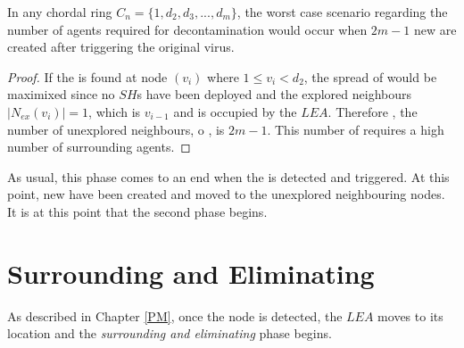  
\begin{theorem}

In any  chordal ring $C_n=\{1,d_2,d_3,...,d_m\}$, the worst case scenario regarding the number of agents required for decontamination would occur when $2m-1$ new \bvs are created after triggering the original virus.
\end{theorem}
\begin{proof}
If the \bv is found at node $(v_i)$ where $1\leq v_i< d_2$, the spread of \bvs would be maximixed since no $SH$s have been deployed and the explored neighbours $|N_{ex}(v_i)|=1$, which is $v_{i-1}$ and  is occupied by the  $LEA$. Therefore , the number of unexplored neighbours, o \bvs, is $2m-1$. This number of \bvs requires a high number of surrounding agents. 
\end{proof}



As usual, this phase comes to an end when the \bv is detected and triggered. At this point, new \bvs have been created and moved to the unexplored neighbouring nodes. It is at this point that the second phase begins. 



\section{Surrounding and Eliminating}
 
As described in Chapter \ref{PM}, once the \bv node is detected, the $LEA$ moves to its location and the {\em surrounding and eliminating} phase begins.
%
%
%

